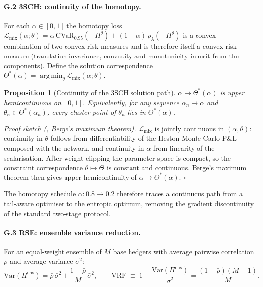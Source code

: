 \documentclass[11pt,oneside]{report}
\newcommand{\cvar}{\mathrm{CVaR}}
\newcommand{\argmin}{\mathop{\mathrm{arg\,min}}}
\newtheorem{proposition}{Proposition}[chapter]
\begin{document}
\paragraph{G.2 \quad 3SCH: continuity of the homotopy.}
\label{thm:berge}
For each $\alpha\in[0,1]$ the homotopy loss
$\mathcal{L}_{\mathrm{mix}}(\alpha;\theta) = \alpha\,\cvar_{0.95}(-\Pi^\theta) + (1-\alpha)\,\rho_\lambda(-\Pi^\theta)$
is a convex combination of two convex risk measures and is therefore itself a convex risk measure (translation invariance, convexity and monotonicity inherit from the components).  Define the solution correspondence $\Theta^*(\alpha) = \argmin_\theta \mathcal{L}_{\mathrm{mix}}(\alpha;\theta)$.

\begin{proposition}[Continuity of the 3SCH solution path]
$\alpha\mapsto\Theta^*(\alpha)$ is upper hemicontinuous on $[0,1]$.  Equivalently, for any sequence $\alpha_n\to\alpha$ and $\theta_n\in\Theta^*(\alpha_n)$, every cluster point of $\theta_n$ lies in $\Theta^*(\alpha)$.
\end{proposition}

\smallskip
\noindent\textit{Proof sketch (\citealp{aliprantis2006infinite}, Berge's maximum theorem).}  $\mathcal{L}_{\mathrm{mix}}$ is jointly continuous in $(\alpha,\theta)$: continuity in $\theta$ follows from differentiability of the Heston Monte-Carlo P\&L composed with the network, and continuity in $\alpha$ from linearity of the scalarisation.  After weight clipping the parameter space is compact, so the constraint correspondence $\theta\mapsto\Theta$ is constant and continuous.  Berge's maximum theorem then gives upper hemicontinuity of $\alpha\mapsto\Theta^*(\alpha)$. \hfill$\square$

The homotopy schedule $\alpha:0.8\to0.2$ therefore traces a continuous path from a tail-aware optimiser to the entropic optimum, removing the gradient discontinuity of the standard two-stage protocol.

\paragraph{G.3 \quad RSE: ensemble variance reduction.}
For an equal-weight ensemble of $M$ base hedgers with average pairwise correlation $\bar\rho$ and average variance $\bar\sigma^2$:
\begin{equation}
    \mathrm{Var}(\Pi^{\mathrm{ens}}) = \bar\rho\,\bar\sigma^2 + \frac{1-\bar\rho}{M}\,\bar\sigma^2,
    \qquad
    \mathrm{VRF} \;\equiv\; 1 - \frac{\mathrm{Var}(\Pi^{\mathrm{ens}})}{\bar\sigma^2} = \frac{(1-\bar\rho)(M-1)}{M}.
    \tag{RSE.1}
\end{equation}
\end{document}
